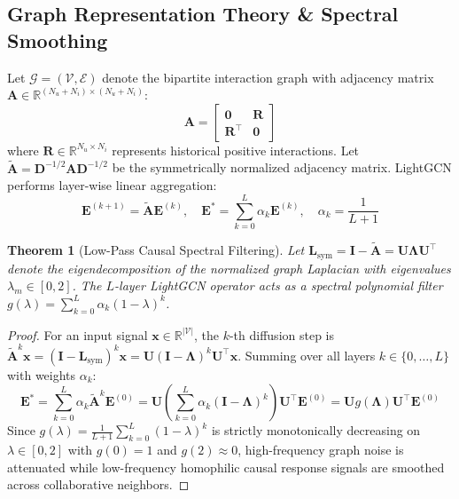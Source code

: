 \documentclass[preprint,12pt,3p]{elsarticle}
\newtheorem{theorem}{Theorem}
\begin{document}
\subsection{Graph Representation Theory \& Spectral Smoothing}
Let $\mathcal{G} = (\mathcal{V}, \mathcal{E})$ denote the bipartite interaction graph with adjacency matrix $\mathbf{A} \in \mathbb{R}^{(N_u + N_i) \times (N_u + N_i)}$:
\begin{equation}
\mathbf{A} = \begin{bmatrix} \mathbf{0} & \mathbf{R} \\ \mathbf{R}^\top & \mathbf{0} \end{bmatrix}
\end{equation}
where $\mathbf{R} \in \mathbb{R}^{N_u \times N_i}$ represents historical positive interactions. Let $\tilde{\mathbf{A}} = \mathbf{D}^{-1/2} \mathbf{A} \mathbf{D}^{-1/2}$ be the symmetrically normalized adjacency matrix. LightGCN performs layer-wise linear aggregation:
\begin{equation}
\mathbf{E}^{(k+1)} = \tilde{\mathbf{A}} \mathbf{E}^{(k)}, \quad \mathbf{E}^* = \sum_{k=0}^L \alpha_k \mathbf{E}^{(k)}, \quad \alpha_k = \frac{1}{L + 1}
\end{equation}

\begin{theorem}[Low-Pass Causal Spectral Filtering]
Let $\mathbf{L}_{\mathrm{sym}} = \mathbf{I} - \tilde{\mathbf{A}} = \mathbf{U} \mathbf{\Lambda} \mathbf{U}^\top$ denote the eigendecomposition of the normalized graph Laplacian with eigenvalues $\lambda_m \in [0, 2]$. The $L$-layer LightGCN operator acts as a spectral polynomial filter $g(\lambda) = \sum_{k=0}^L \alpha_k (1 - \lambda)^k$.
\end{theorem}
\begin{proof}
For an input signal $\mathbf{x} \in \mathbb{R}^{|\mathcal{V}|}$, the $k$-th diffusion step is $\tilde{\mathbf{A}}^k \mathbf{x} = (\mathbf{I} - \mathbf{L}_{\mathrm{sym}})^k \mathbf{x} = \mathbf{U} (\mathbf{I} - \mathbf{\Lambda})^k \mathbf{U}^\top \mathbf{x}$. Summing over all layers $k \in \{0, \dots, L\}$ with weights $\alpha_k$:
\begin{equation}
\mathbf{E}^* = \sum_{k=0}^L \alpha_k \tilde{\mathbf{A}}^k \mathbf{E}^{(0)} = \mathbf{U} \left( \sum_{k=0}^L \alpha_k (\mathbf{I} - \mathbf{\Lambda})^k \right) \mathbf{U}^\top \mathbf{E}^{(0)} = \mathbf{U} g(\mathbf{\Lambda}) \mathbf{U}^\top \mathbf{E}^{(0)}
\end{equation}
Since $g(\lambda) = \frac{1}{L+1} \sum_{k=0}^L (1 - \lambda)^k$ is strictly monotonically decreasing on $\lambda \in [0, 2]$ with $g(0) = 1$ and $g(2) \approx 0$, high-frequency graph noise is attenuated while low-frequency homophilic causal response signals are smoothed across collaborative neighbors.
\end{proof}
\end{document}
